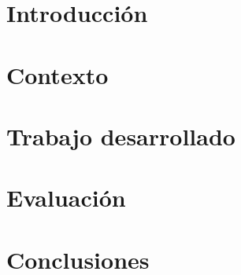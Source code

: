 \documentclass[12pt, a4paper, titlepage, twoside, openright]{report}
\begin{document}
	
	\cleardoublepage
	
	\cleardoublepage
	
	\cleardoublepage
	
	\cleardoublepage
	
	\cleardoublepage
	
	
	\cleardoublepage
	
	
	\cleardoublepage
	
	\tableofcontents
	\cleardoublepage
	
	\pagestyle{fancy}
	\chapter{Introducción}
	\label{introduction}
	\cleardoublepage
	
	\chapter{Contexto}
	\label{background}
	
	\cleardoublepage

	\chapter{Trabajo desarrollado}
	\label{mainwork}
	\cleardoublepage
	
	\chapter{Evaluación}
	\label{evaluation}
	\cleardoublepage
	
	\chapter{Conclusiones}
	\label{conclusions}
	\cleardoublepage
	
	\listoftables
	\cleardoublepage
	
	\listoffigures
	\cleardoublepage
	
	\appendix
	\label{appendices}
	
	
	
\end{document}

